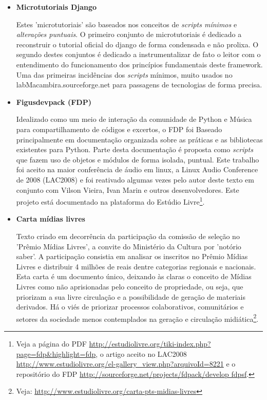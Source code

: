 \begin{itemize}
    \item {\bf Microtutoriais Django ~\cite{dmicrotuts}}

Estes 'microtutoriais' são baseados nos conceitos de \emph{scripts mínimos} e
\emph{alterações puntuais}. O primeiro conjunto de microtutoriais é dedicado
a reconstruir o tutorial oficial do django de forma condensada e não prolixa.
O segundo destes conjuntos é dedicado a instrumentalizar de fato o leitor com
o entendimento do funcionamento dos princípios fundamentais deste framework.
Uma das primeiras incidências dos \emph{scripts} mínimos, muito usados no
labMacambira.sourceforge.net para passagens de tecnologias de forma precisa.

     \item {\bf Figusdevpack (FDP)}

Idealizado como um meio de interação da comunidade de Python e Música 
para compartilhamento de códigos e excertos, o FDP foi Baseado principalmente
em documentação organizada sobre as práticas e as bibliotecas
existentes para Python. Parte desta documentação
é proposta como \emph{scripts} que
fazem uso de objetos e módulos de forma isolada, puntual.
 Este trabalho foi aceito na
maior conferência de áudio em linux, a Linux Audio Conference de 2008
(LAC2008) e foi reativado algumas vezes pelo autor deste texto
em conjunto com Vilson Vieira, Ivan Marin
e outros desenvolvedores. Este projeto está
documentado na plataforma do Estúdio Livre\footnote{
Veja a página do PDF \url{http://estudiolivre.org/tiki-index.php?page=fdp&highlight=fdp}, o artigo aceito no LAC2008 \url{http://www.estudiolivre.org/el-gallery_view.php?arquivoId=8221}
e o repositório do FDP \url{http://sourceforge.net/projects/fdpack/develop fdpsf}.}.


    \item {\bf Carta mídias livres}

Texto criado em decorrência da participação da comissão de seleção no
'Prêmio Mídias Livres', a convite do Ministério da Cultura por 'notório saber'. A participação consistia em analisar os inscritos no Prêmio Mídias Livres e distribuir 4 milhões de reais dentre categorias regionais e nacionais.
Esta carta é um documento único, deixando às claras
o conceito de Mídias Livres como não aprisionadas pelo conceito
de propriedade, ou seja, que priorizam a sua livre circulação e a possibilidade
de geração de materiais derivados. Há o viés de priorizar processos colaborativos, comunitários e setores da sociedade menos contemplados na geração e circulação midiática\footnote{Veja: \url{http://www.estudiolivre.org/carta-pts-midias-livres}}.


\end{itemize}
